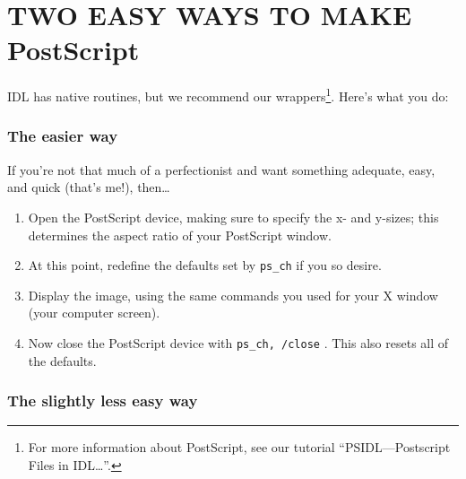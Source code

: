 \documentclass[psfig,preprint]{aastex}
\begin{document}
\section{TWO EASY WAYS TO MAKE PostScript} \label{easyps}

IDL has native routines, but we recommend our wrappers\footnote{For more
  information about PostScript, see our tutorial ``PSIDL---Postscript
  Files in IDL\dots''.}. Here's what you do: 

\subsubsection{The easier way}

If you're not that much of a perfectionist and want something
adequate, easy, and quick (that's me!), then\dots

\begin{enumerate}

\item Open the PostScript device, making sure to specify the x- and
  y-sizes; this determines the aspect ratio of your PostScript window.


\item At this point, redefine the defaults set by {\tt ps\_ch} if you so
  desire. 

\item Display the image, using the same commands you used for your X
  window (your computer screen). 

\item Now close the PostScript device with {\tt ps\_ch, /close} . This
  also resets all of the defaults.
\end{enumerate}


\subsubsection{The slightly less easy way}
\end{document}
